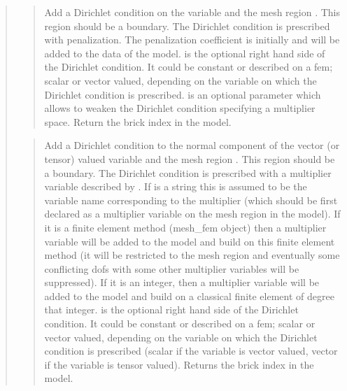 \documentclass[a4paper,11pt,english]{sphinxmanual}
\begin{document}
\begin{quote}
\sphinxAtStartPar
{}
\begin{quote}

\sphinxAtStartPar
Add a Dirichlet condition on the variable  and the mesh
region . This region should be a boundary. The Dirichlet
condition is prescribed with penalization. The penalization coefficient
is initially  and will be added to the data of the model.
 is the optional right hand side of the Dirichlet condition.
It could be constant or described on a fem; scalar or vector valued,
depending on the variable on which the Dirichlet condition is prescribed.
 is an optional parameter which allows to weaken the
Dirichlet condition specifying a multiplier space.
Return the brick index in the model.
\end{quote}

\sphinxAtStartPar
{}
\begin{quote}

\sphinxAtStartPar
Add a Dirichlet condition to the normal component of the vector
(or tensor) valued variable  and the mesh
region . This region should be a boundary. The Dirichlet
condition is prescribed with a multiplier variable described by
. If  is a string this is assumed
to be the variable name corresponding to the multiplier (which should be
first declared as a multiplier variable on the mesh region in the model).
If it is a finite element method (mesh\_fem object) then a multiplier
variable will be added to the model and build on this finite element
method (it will be restricted to the mesh region  and eventually
some conflicting dofs with some other multiplier variables will be
suppressed). If it is an integer, then a  multiplier variable will be
added to the model and build on a classical finite element of degree
that integer.  is the optional right hand side of  the
Dirichlet condition. It could be constant or described on a fem; scalar
or vector valued, depending on the variable on which the Dirichlet
condition is prescribed (scalar if the variable
is vector valued, vector if the variable is tensor valued).
Returns the brick index in the model.
\end{quote}


\end{quote}
\end{document}
